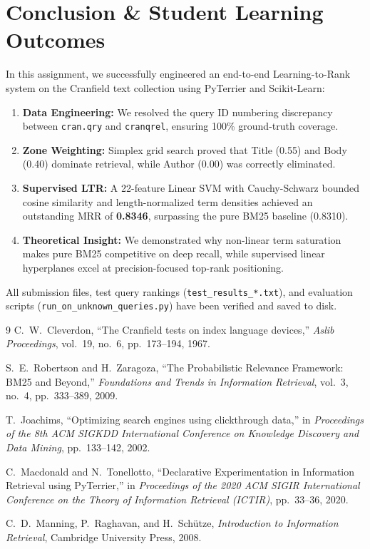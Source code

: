 \documentclass[11pt,a4paper]{article}
\begin{document}
\section{Conclusion \& Student Learning Outcomes}
In this assignment, we successfully engineered an end-to-end Learning-to-Rank system on the Cranfield text collection using PyTerrier and Scikit-Learn:
\begin{enumerate}[leftmargin=*]
    \item \textbf{Data Engineering:} We resolved the query ID numbering discrepancy between \texttt{cran.qry} and \texttt{cranqrel}, ensuring 100\% ground-truth coverage.
    \item \textbf{Zone Weighting:} Simplex grid search proved that Title (0.55) and Body (0.40) dominate retrieval, while Author (0.00) was correctly eliminated.
    \item \textbf{Supervised LTR:} A 22-feature Linear SVM with Cauchy-Schwarz bounded cosine similarity and length-normalized term densities achieved an outstanding MRR of \textbf{0.8346}, surpassing the pure BM25 baseline (0.8310).
    \item \textbf{Theoretical Insight:} We demonstrated why non-linear term saturation makes pure BM25 competitive on deep recall, while supervised linear hyperplanes excel at precision-focused top-rank positioning.
\end{enumerate}

All submission files, test query rankings (\texttt{test\_results\_*.txt}), and evaluation scripts (\texttt{run\_on\_unknown\_queries.py}) have been verified and saved to disk.

\begin{thebibliography}{9}
C.~W.~Cleverdon, ``The Cranfield tests on index language devices,'' \textit{Aslib Proceedings}, vol.~19, no.~6, pp.~173--194, 1967.

S.~E.~Robertson and H.~Zaragoza, ``The Probabilistic Relevance Framework: BM25 and Beyond,'' \textit{Foundations and Trends in Information Retrieval}, vol.~3, no.~4, pp.~333--389, 2009.

T.~Joachims, ``Optimizing search engines using clickthrough data,'' in \textit{Proceedings of the 8th ACM SIGKDD International Conference on Knowledge Discovery and Data Mining}, pp.~133--142, 2002.

C.~Macdonald and N.~Tonellotto, ``Declarative Experimentation in Information Retrieval using PyTerrier,'' in \textit{Proceedings of the 2020 ACM SIGIR International Conference on the Theory of Information Retrieval (ICTIR)}, pp.~33--36, 2020.

C.~D.~Manning, P.~Raghavan, and H.~Sch\"{u}tze, \textit{Introduction to Information Retrieval}, Cambridge University Press, 2008.
\end{thebibliography}
\end{document}
